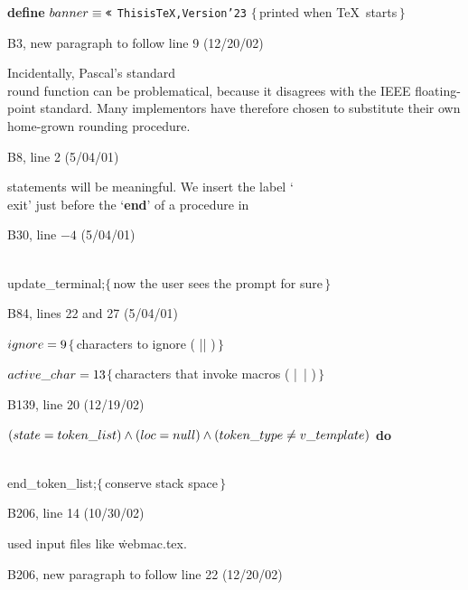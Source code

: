 {\ninepoint\noindent\hskip10pt
{\bf define} $\\{banner}\equiv\hbox{\tt\char'23}$%
{\tt This\]is\]TeX,\]Version\char'23}\quad
$\{\,$printed when \TeX\ starts$\,\}$

\bugonpage B3, new paragraph to follow line 9 (12/20/02)

\tenpoint\noindent\quad
Incidentally, Pascal's standard \\{round} function can be problematical,
because it disagrees with the IEEE floating-point standard.
Many implementors have
therefore chosen to substitute their own home-grown rounding procedure.

\bugonpage B8, line 2 (5/04/01)

\tenpoint\noindent
statements will be meaningful. We insert the label
`\\{exit}' just before the `{\bf end}' of a procedure in\cutpar

\bugonpage B30, line $-4$ (5/04/01)

\ninepoint\noindent
{} \\{update\_terminal};\quad$\{\,$now the user sees
 the prompt for sure$\,\}$

\bugonpage B84, lines 22 and 27 (5/04/01)

\ninepoint\noindent
\quad$\\{ignore}=9$\quad$\{\,$characters to ignore ( |^^@| )$\,\}$\par
\noindent
\quad$\\{active\_char}=13$\quad$\{\,$characters that invoke
 macros ( |~| )$\,\}$

\bugonpage B139, line 20 (12/19/02)

\ninepoint\noindent
{} $(\\{state}=\\{token\_list}) \land
 (\\{loc}=\\{null}) \land (\\{token\_type}\ne\\{v\_template})$ {\bf do}\par
\noindent\qquad\\{end\_token\_list};\quad$\{\,$conserve stack space$\,\}$

\bugonpage B206, line 14 (10/30/02)

\tenpoint\noindent
used input files like \.{webmac.tex}.

\bugonpage B206, new paragraph to follow line 22 (12/20/02)

}
